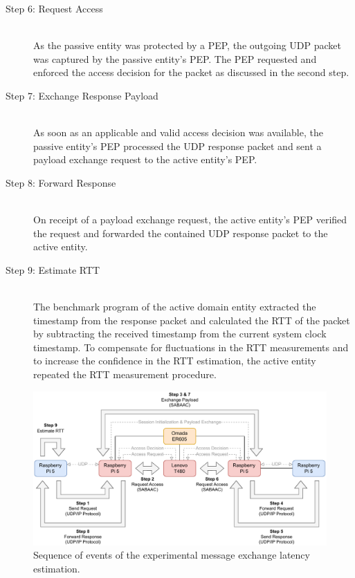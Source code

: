 \begin{description}
    \item[Step 6: Request Access]~\\
    As the passive entity was protected by a PEP, the outgoing UDP packet was captured by the passive entity's PEP.
    The PEP requested and enforced the access decision for the packet as discussed in the second step.

    \item[Step 7: Exchange Response Payload]~\\
    As soon as an applicable and valid access decision was available, the passive entity's PEP processed the UDP response packet and sent a payload exchange request to the active entity's PEP.

    \item[Step 8: Forward Response]~\\
    On receipt of a payload exchange request, the active entity's PEP verified the request and forwarded the contained UDP response packet to the active entity.

    \item[Step 9: Estimate RTT]~\\
    The benchmark program of the active domain entity extracted the timestamp from the response packet and calculated the RTT of the packet by subtracting the received timestamp from the current system clock timestamp.
    To compensate for fluctuations in the RTT measurements and to increase the confidence in the RTT estimation, the active entity repeated the RTT measurement procedure.
\end{description}
\begin{figure}
    \centering
    \includegraphics[width=1.0\linewidth]{figures/performance_evaluation_steps.drawio.pdf}
    \caption{Sequence of events of the experimental message exchange latency estimation.}
    \label{fig:performance_analysis_latency_steps}
\end{figure}

